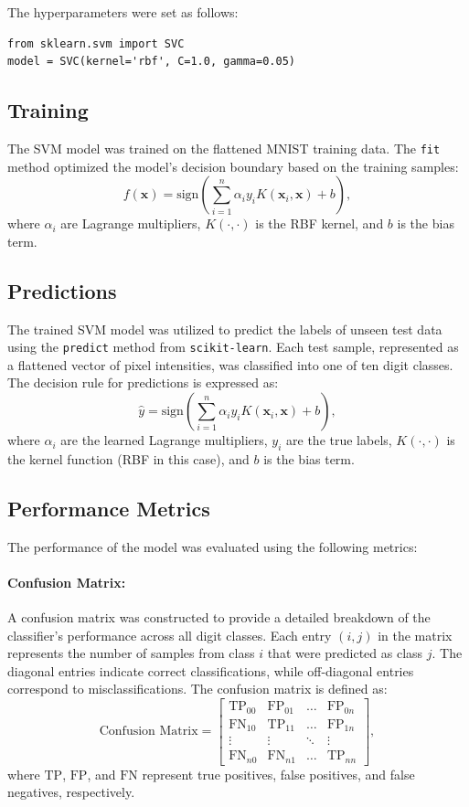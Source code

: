 \documentclass{article}
\begin{document}
The hyperparameters were set as follows:
\begin{verbatim}
from sklearn.svm import SVC
model = SVC(kernel='rbf', C=1.0, gamma=0.05)
\end{verbatim}

\subsection*{Training}
The SVM model was trained on the flattened MNIST training data. The \texttt{fit} method optimized the model’s decision boundary based on the training samples:
\[
f(\mathbf{x}) = \text{sign}\left( \sum_{i=1}^{n} \alpha_i y_i K(\mathbf{x}_i, \mathbf{x}) + b \right),
\]
where $\alpha_i$ are Lagrange multipliers, $K(\cdot, \cdot)$ is the RBF kernel, and $b$ is the bias term.

\subsection*{Predictions}
The trained SVM model was utilized to predict the labels of unseen test data using the \texttt{predict} method from \texttt{scikit-learn}. Each test sample, represented as a flattened vector of pixel intensities, was classified into one of ten digit classes. The decision rule for predictions is expressed as:
\[
\hat{y} = \text{sign} \left( \sum_{i=1}^{n} \alpha_i y_i K(\mathbf{x}_i, \mathbf{x}) + b \right),
\]
where $\alpha_i$ are the learned Lagrange multipliers, $y_i$ are the true labels, $K(\cdot, \cdot)$ is the kernel function (RBF in this case), and $b$ is the bias term. 


\subsection*{Performance Metrics}
The performance of the model was evaluated using the following metrics:

\paragraph{Confusion Matrix:}
A confusion matrix was constructed to provide a detailed breakdown of the classifier's performance across all digit classes. Each entry $(i, j)$ in the matrix represents the number of samples from class $i$ that were predicted as class $j$. The diagonal entries indicate correct classifications, while off-diagonal entries correspond to misclassifications. The confusion matrix is defined as:
\[
\text{Confusion Matrix} = \begin{bmatrix}
\text{TP}_{00} & \text{FP}_{01} & \dots & \text{FP}_{0n} \\
\text{FN}_{10} & \text{TP}_{11} & \dots & \text{FP}_{1n} \\
\vdots & \vdots & \ddots & \vdots \\
\text{FN}_{n0} & \text{FN}_{n1} & \dots & \text{TP}_{nn}
\end{bmatrix},
\]
where $\text{TP}$, $\text{FP}$, and $\text{FN}$ represent true positives, false positives, and false negatives, respectively.
\end{document}
